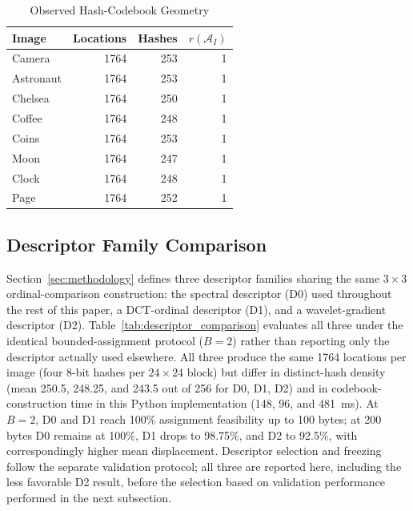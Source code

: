 \documentclass[preprint,12pt]{elsarticle}
\theoremstyle{plain}
\begin{document}
\begin{table}[!t]
\centering
\caption{Observed Hash-Codebook Geometry}
\label{tab:codebook_geometry}
\begin{tabular}{lrrr}
\toprule
\textbf{Image} & \textbf{Locations} & \textbf{Hashes} & $r(\mathcal{A}_I)$ \\
\midrule
Camera    & 1764 & 253 & 1 \\
Astronaut & 1764 & 253 & 1 \\
Chelsea   & 1764 & 250 & 1 \\
Coffee    & 1764 & 248 & 1 \\
Coins     & 1764 & 253 & 1 \\
Moon      & 1764 & 247 & 1 \\
Clock     & 1764 & 248 & 1 \\
Page      & 1764 & 252 & 1 \\
\bottomrule
\end{tabular}
\end{table}

\subsection{Descriptor Family Comparison}

Section~\ref{sec:methodology} defines three descriptor families sharing the
same $3\times3$ ordinal-comparison construction: the spectral descriptor
(D0) used throughout the rest of this paper, a DCT-ordinal descriptor (D1),
and a wavelet-gradient descriptor (D2). Table~\ref{tab:descriptor_comparison}
evaluates all three under the identical bounded-assignment protocol
($B=2$) rather than reporting only the descriptor actually used elsewhere.
All three produce the same 1764 locations per image (four 8-bit hashes per
$24\times24$ block) but differ in distinct-hash density (mean 250.5, 248.25,
and 243.5 out of 256 for D0, D1, D2) and in codebook-construction time in this
Python implementation (148, 96, and 481~ms). At $B=2$, D0 and D1 reach 100\%
assignment feasibility up to 100 bytes; at 200 bytes D0 remains at 100\%, D1
drops to 98.75\%, and D2 to 92.5\%, with correspondingly higher mean
displacement. Descriptor selection and freezing follow the separate
validation protocol; all three are reported here, including the less favorable D2 result, before
the selection based on validation performance performed in the next subsection.

\begin{table}[!t]
\centering
\caption{Descriptor Family Comparison Under the Bounded Assignment Protocol ($B=2$)}
\label{tab:descriptor_comparison}
\resizebox{\linewidth}{!}{}
\end{table}
\end{document}
